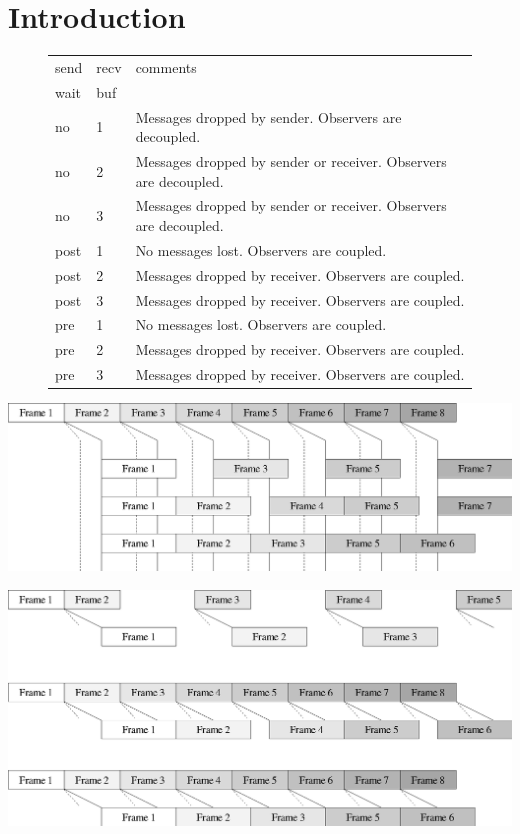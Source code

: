 \section{Introduction}



\begin{figure}
\begin{tabular}{llp{8in}}
send & recv & comments \\
wait & buf & \\
no & 1 & Messages dropped by sender. Observers are decoupled.\\
no & 2 & Messages dropped by sender or receiver.  Observers are decoupled. \\
no & 3 & Messages dropped by sender or receiver. Observers are decoupled. \\
post & 1 & No messages lost. Observers are coupled. \\
post & 2 & Messages dropped by receiver.  Observers are coupled.\\
post & 3 & Messages dropped by receiver.  Observers are coupled.\\
pre & 1 & No messages lost. Observers are coupled. \\
pre & 2 & Messages dropped by receiver. Observers are coupled.\\
pre & 3 & Messages dropped by receiver. Observers are coupled.
\end{tabular}

\end{figure}


\includegraphics[width=\columnwidth]{fig-throughput-nowait}

\includegraphics[width=\columnwidth]{fig-throughput-prewait}

